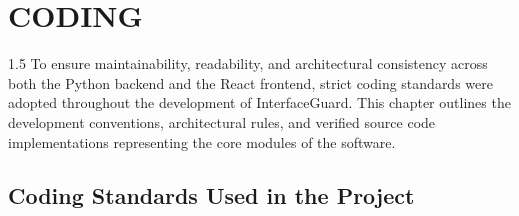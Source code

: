 \documentclass[12pt,a4paper]{article}
\begin{document}
 
\clearpage


\section{CODING}

\begin{spacing}{1.5}
\justifying
To ensure maintainability, readability, and architectural consistency across both the Python backend and the React frontend, strict coding standards were adopted throughout the development of InterfaceGuard. This chapter outlines the development conventions, architectural rules, and verified source code implementations representing the core modules of the software.
\end{spacing}

\subsection{Coding Standards Used in the Project}
\end{document}
